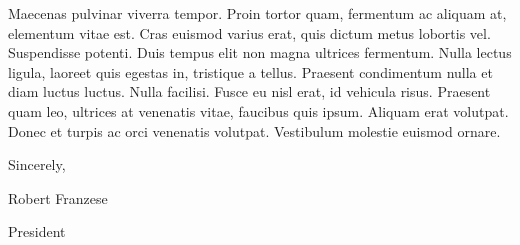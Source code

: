 \documentclass[12pt]{article}
\begin{document}
Maecenas pulvinar viverra tempor. Proin tortor quam, fermentum ac aliquam at, elementum vitae est. Cras euismod varius erat, quis dictum metus lobortis vel. Suspendisse potenti. Duis tempus elit non magna ultrices fermentum. Nulla lectus ligula, laoreet quis egestas in, tristique a tellus. Praesent condimentum nulla et diam luctus luctus. Nulla facilisi. Fusce eu nisl erat, id vehicula risus. Praesent quam leo, ultrices at venenatis vitae, faucibus quis ipsum. Aliquam erat volutpat. Donec et turpis ac orci venenatis volutpat. Vestibulum molestie euismod ornare.


\vspace{3em}

\hspace{4in}Sincerely,

\vspace{4em}

\hspace{4in}Robert Franzese

\hspace{4in}President
\end{document}
